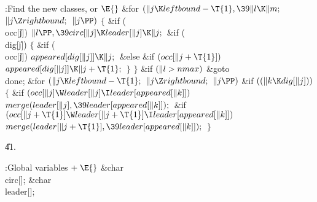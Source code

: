 \Y\B\4:Find the new classes, or \X${}\E{}$\6
\&{for} ${}(\|j\K\\{leftbound}-\T{1},\39\|l\K\|m;{}$ ${}\|j\Z\\{rightbound};{}$
${}\|j\PP){}$\5
${}\{{}$\1\6
\&{if} (\\{occ}[\|j])\1\5
${}\|l\PP,\39\\{circ}[\|j]\K\\{leader}[\|j]\K\|j;{}$\2\6
\&{if} (\\{dig}[\|j])\5
${}\{{}$\1\6
\&{if} (\\{occ}[\|j])\1\5
${}\\{appeared}[\\{dig}[\|j]]\K\|j;{}$\2\6
\&{else} \&{if} ${}(\\{occ}[\|j+\T{1}]){}$\1\5
${}\\{appeared}[\\{dig}[\|j]]\K\|j+\T{1};{}$\2\6
\4${}\}{}$\2\6
\4${}\}{}$\2\6
\&{if} ${}(\|l>\\{nmax}){}$\1\5
\&{goto} \\{done};\2\6
\&{for} ${}(\|j\K\\{leftbound}-\T{1};{}$ ${}\|j\Z\\{rightbound};{}$ ${}\|j%
\PP){}$\1\6
\&{if} ${}((\|k\K\\{dig}[\|j])){}$\5
${}\{{}$\1\6
\&{if} ${}(\\{occ}[\|j]\W\\{leader}[\|j]\I\\{leader}[\\{appeared}[\|k]]){}$\1\5
${}\\{merge}(\\{leader}[\|j],\39\\{leader}[\\{appeared}[\|k]]);{}$\2\6
\&{if} ${}(\\{occ}[\|j+\T{1}]\W\\{leader}[\|j+\T{1}]\I\\{leader}[\\{appeared}[%
\|k]]){}$\1\5
${}\\{merge}(\\{leader}[\|j+\T{1}],\39\\{leader}[\\{appeared}[\|k]]);{}$\2\6
\4${}\}{}$\2\2\par
\U41.\fi

\B{}:Global variables\X${}\mathrel+\E{}$\6
\&{char} \\{circ}[];\6
\&{char} \\{leader}[];\par
\fi

